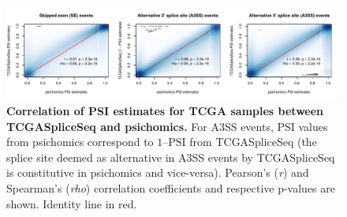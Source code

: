 \begin{figure}[!ht]
  \includegraphics[width=1\textwidth]{images/psichomics/tcgaspliceseq-correlation}
  \centering
  \caption[Correlation of PSI estimates between TCGASpliceSeq and psichomics]{\textbf{Correlation of PSI estimates for TCGA samples between TCGASpliceSeq and psichomics.} For A3SS events, PSI values from psichomics correspond to $1 – \textrm{PSI}$ from TCGASpliceSeq (the splice site deemed as alternative in A3SS events by TCGASpliceSeq is constitutive in psichomics and vice-versa). Pearson’s (\emph{r}) and Spearman’s (\emph{rho}) correlation coefficients and respective p-values are shown. Identity line in red.}
  \label{fig:tcgaspliceseq-correlation}
  \vspace{-\intextsep}
\end{figure}













